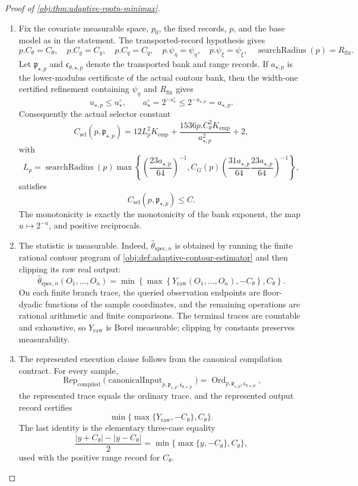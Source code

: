 \begin{proof}[Proof of \cref{obj:thm:adaptive-rootn-minimax}]
\begin{enumerate}
\item Fix the covariate measurable space, \(p_0\), the fixed records, \(p\), and the base model as in the statement.  The transported-record hypothesis gives
\[
p.C_{\theta}=C_{\theta},\quad p.C_g=C_g,\quad p.C_q=C_q,\quad p.\psi_{\eta}=\psi_{\eta},\quad p.\psi_{\xi}=\psi_{\xi},
\quad \operatorname{searchRadius}(p)=R_{\mathrm{fix}}.
\]
Let \(\mathfrak p_{\star,p}\) and \(\mathfrak c_{\theta,\star,p}\) denote the transported bank and range records.  If \(a_{\star,p}\) is the lower-modulus certificate of the actual contour bank, then the width-one certified refinement containing \(\psi_{\eta}\) and \(R_{\mathrm{fix}}\) gives
\[
u_{\star,p}\le u_{\star}^{\circ},
\qquad
a_{\star}^{\circ}=2^{-u_{\star}^{\circ}}\le 2^{-u_{\star,p}}=a_{\star,p}.
\]
Consequently the actual selector constant
\[
C_{\mathrm{sel}}(p,\mathfrak p_{\star,p})
=
12L_p^2K_{\mathrm{emp}}
+\frac{1536p.C_{\theta}^2K_{\mathrm{emp}}}{a_{\star,p}^2}
+2,
\]
with
\[
L_p
=
\operatorname{searchRadius}(p)
\max\left\{
\left(\frac{23a_{\star,p}}{64}\right)^{-1},
C_G(p)
\left(\frac{31a_{\star,p}}{64}\frac{23a_{\star,p}}{64}\right)^{-1}
\right\},
\]
satisfies
\[
C_{\mathrm{sel}}(p,\mathfrak p_{\star,p})\le C.
\]
The monotonicity is exactly the monotonicity of the bank exponent, the map \(u\mapsto 2^{-u}\), and positive reciprocals. %

\item The statistic is measurable.  Indeed, \(\widehat\theta_{\mathrm{spec},n}\) is obtained by running the finite rational contour program of \cref{obj:def:adaptive-contour-estimator} and then clipping its raw real output:
\[
\widehat\theta_{\mathrm{spec},n}(O_1,\ldots,O_n)
=
\min\left\{
\max\left\{Y_{\mathrm{raw}}(O_1,\ldots,O_n),-C_{\theta}\right\},
C_{\theta}
\right\}.
\]
On each finite branch trace, the queried observation endpoints are floor-dyadic functions of the sample coordinates, and the remaining operations are rational arithmetic and finite comparisons.  The terminal traces are countable and exhaustive, so \(Y_{\mathrm{raw}}\) is Borel measurable; clipping by constants preserves measurability. %

\item The represented execution clause follows from the canonical compilation contract.  For every sample,
\[
\operatorname{Rep}_{\mathrm{compiled}}
\bigl(\operatorname{canonicalInput}_{p,\mathfrak p_{\star,p},\mathfrak c_{\theta,\star,p}}\bigr)
=
\operatorname{Ord}_{p,\mathfrak p_{\star,p},\mathfrak c_{\theta,\star,p}},
\]
the represented trace equals the ordinary trace, and the represented output record certifies
\[
\min\{\max\{Y_{\mathrm{raw}},-C_{\theta}\},C_{\theta}\}.
\]
The last identity is the elementary three-case equality
\[
\frac{|y+C_{\theta}|-|y-C_{\theta}|}{2}
=
\min\{\max\{y,-C_{\theta}\},C_{\theta}\},
\]
used with the positive range record for \(C_{\theta}\). %


\end{enumerate}
\end{proof}
